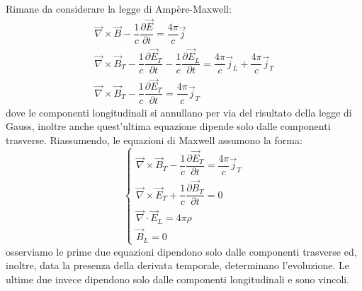 Rimane da considerare la legge di Ampère-Maxwell:
\begin{equation*}
    \begin{gathered}
      \Vec{\nabla}\times\Vec{B}-\dfrac{1}{c}\dfrac{\partial\Vec{E}}{\partial t}=\dfrac{4\pi}{c}\Vec{j}\\
       \Vec{\nabla}\times\Vec{B}_T-\dfrac{1}{c}\dfrac{\partial\Vec{E}_T}{\partial t}-\dfrac{1}{c}\dfrac{\partial\Vec{E}_L}{\partial t}=\dfrac{4\pi}{c}\Vec{j}_L+\dfrac{4\pi}{c}\Vec{j}_T\\
       \Vec{\nabla}\times\Vec{B}_T-\dfrac{1}{c}\dfrac{\partial\Vec{E}_T}{\partial t}=\dfrac{4\pi}{c}\Vec{j}_T
    \end{gathered}
\end{equation*}
dove le componenti longitudinali si annullano per via del risultato della legge di Gauss, inoltre anche quest'ultima equazione dipende solo dalle componenti trasverse.
Riassumendo, le equazioni di Maxwell assumono la forma:
\begin{equation}
\begin{cases}
  \Vec{\nabla}\times\Vec{B}_T-\dfrac{1}{c}\dfrac{\partial\Vec{E}_T}{\partial t}=\dfrac{4\pi}{c}\Vec{j}_T\\
  \Vec{\nabla}\times\Vec{E}_T+\dfrac{1}{c}\dfrac{\partial\Vec{B}_T}{\partial t} =0\\
 \Vec{\nabla}\cdot\Vec{E}_L=4\pi\rho \\
    \Vec{B}_L=0
\end{cases}
\end{equation}
osserviamo le prime due equazioni dipendono solo dalle componenti trasverse ed, inoltre, data la presenza della derivata temporale, determinano l'evoluzione. Le ultime due invece dipendono solo dalle componenti longitudinali e sono vincoli.

